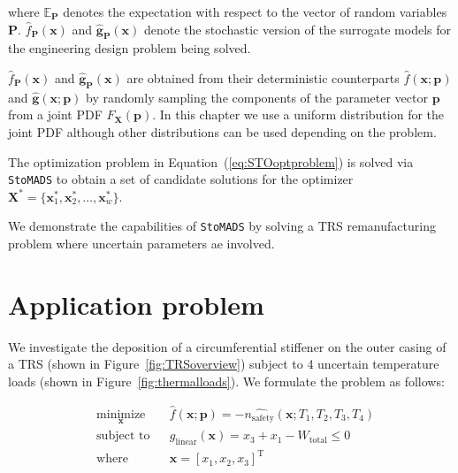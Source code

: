 where $\mathbb{E}_{\mathbf{P}}$ denotes the expectation with respect to the vector of random variables $\mathbf{P}$. $\hat{f}_{\mathbf{P}}(\mathbf{x})$ and $\hat{\mathbf{g}}_{\mathbf{P}}(\mathbf{x})$ denote the stochastic version of the surrogate models for the engineering design problem being solved.

$\hat{f}_{\mathbf{P}}(\mathbf{x})$ and $\hat{\mathbf{g}}_{\mathbf{P}}(\mathbf{x})$ are obtained from their deterministic counterparts $\hat{f}(\mathbf{x};{\mathbf{p}})$ and $\hat{\mathbf{g}}(\mathbf{x};{\mathbf{p}})$ by randomly sampling the components of the parameter vector $\mathbf{p}$ from a joint \ac{PDF} $F_{\mathbf{X}}(\mathbf{p})$. In this chapter we use a uniform distribution for the joint \ac{PDF} although other distributions can be used depending on the problem.

The optimization problem in Equation~(\ref{eq:STOoptproblem}) is solved via \texttt{StoMADS} to obtain a set of candidate solutions for the optimizer $\mathbf{X}^*=  \{ \mathbf{x}^*_1,\mathbf{x}^*_2,\ldots,\mathbf{x}^*_w \} $.

We demonstrate the capabilities of \texttt{StoMADS} by solving a \ac{TRS} remanufacturing problem where uncertain parameters ae involved.

\section{Application problem} \label{sec:STOcasestudy}

We investigate the deposition of a circumferential stiffener on the outer casing of a \ac{TRS} (shown in Figure~\ref{fig:TRSoverview}) subject to 4 uncertain temperature loads (shown in Figure~\ref{fig:thermalloads}). We formulate the problem as follows:

\begin{equation} \label{eq:Stoproblemdet}
    \begin{aligned}
        & \underset{\mathbf{x}}{\text{minimize}}
        & & \hat{f}(\mathbf{x};\mathbf{p}) = -\hat{n_{\textrm{safety}}}(\mathbf{x};T_1,T_2,T_3,T_4)\\
        & \text{subject to}
        & & {g_{\textrm{linear}}}(\mathbf{x}) = x_3 + x_1 - W_{\textrm{total}} \le 0\\
        & \text{where}
        & & \mathbf{x} = \left[x_1,x_2,x_3\right]^{\mathrm{T}}\\
    \end{aligned}
\end{equation}

